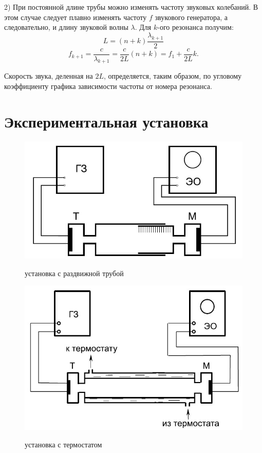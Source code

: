 \documentclass[12pt,a4paper]{article}
\begin{document}
	2) При постоянной длине трубы можно изменять частоту звуковых
	колебаний.
	В этом случае следует плавно изменять частоту $f$ звукового генератора, а следовательно, и длину звуковой волны $\lambda$.
	Для $k$-ого резонанса получим:
	$$L = (n+k)\frac{\lambda_{k+1}}{2}$$
	$$f_{k+1} = \frac{c}{\lambda_{k+1}}=\frac{c}{2L}(n+k)=f_1 + \frac{c}{2L}k.$$
	
	Скорость звука, деленная на $2L$, определяется, таким образом, по угловому коэффициенту графика зависимости частоты от номера резонанса.
		

	\section*{Экспериментальная установка}
	
	\begin{figure}[h]
		\caption{установка с раздвижной трубой}
		\includegraphics[scale=0.65]{scheme1.jpg}
		\label{scheme1}
	\end{figure}

	\begin{figure}[h]
		\caption{установка с термостатом}
		\includegraphics[scale=0.65]{scheme2.jpg}
		\label{scheme2}
	\end{figure}
	
\end{document}
